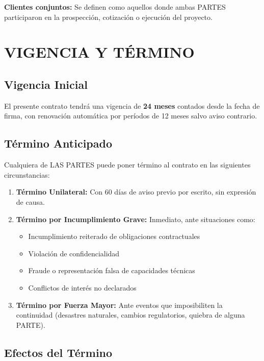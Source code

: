 \documentclass[11pt,letterpaper]{article}
\begin{document}
\textbf{Clientes conjuntos:} Se definen como aquellos donde ambas PARTES participaron en la prospección, cotización o ejecución del proyecto.


\section{VIGENCIA Y TÉRMINO}

\subsection{Vigencia Inicial}

El presente contrato tendrá una vigencia de \textbf{24 meses} contados desde la fecha de firma, con renovación automática por períodos de 12 meses salvo aviso contrario.

\subsection{Término Anticipado}

Cualquiera de LAS PARTES puede poner término al contrato en las siguientes circunstancias:

\begin{enumerate}[label=\alph*)]
    \item \textbf{Término Unilateral:} Con 60 días de aviso previo por escrito, sin expresión de causa.
    
    \item \textbf{Término por Incumplimiento Grave:} Inmediato, ante situaciones como:
    \begin{itemize}
        \item Incumplimiento reiterado de obligaciones contractuales
        \item Violación de confidencialidad
        \item Fraude o representación falsa de capacidades técnicas
        \item Conflictos de interés no declarados
    \end{itemize}
    
    \item \textbf{Término por Fuerza Mayor:} Ante eventos que imposibiliten la continuidad (desastres naturales, cambios regulatorios, quiebra de alguna PARTE).
\end{enumerate}

\subsection{Efectos del Término}
\end{document}
